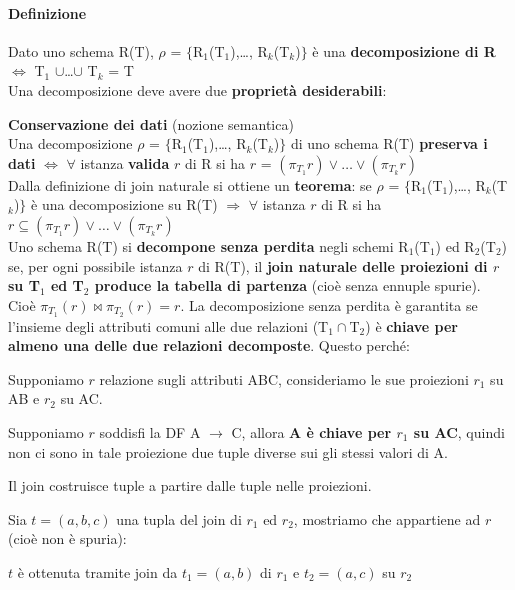 \documentclass[10pt]{book}
\begin{document}
\paragraph{Definizione} Dato uno schema R(T), $\rho$ = $\{$R$_1$(T$_1$),\ldots, R$_k$(T$_k$)$\}$ è una \textbf{decomposizione di R} $\Leftrightarrow$ T$_1$ $\cup$\ldots$\cup$ T$_k$ = T\\
Una decomposizione deve avere due \textbf{proprietà desiderabili}:
\begin{list}{}{}
	\item \textbf{Conservazione dei dati} (nozione semantica)\\
	Una decomposizione $\rho$ = $\{$R$_1$(T$_1$),\ldots, R$_k$(T$_k$)$\}$ di uno schema R(T) \textbf{preserva i dati} $\Leftrightarrow$ $\forall$ istanza \textbf{valida} $r$ di R si ha $r$ = $(\pi_{T_1}r)\vee\ldots\vee(\pi_{T_k}r)$\\
	Dalla definizione di join naturale si ottiene un \textbf{teorema}: se $\rho$ = $\{$R$_1$(T$_1$),\ldots, R$_k$(T$_k$)$\}$ è una decomposizione su R(T) $\Rightarrow$ $\forall$ istanza $r$ di R si ha $r\subseteq(\pi_{T_1}r)\vee\ldots\vee(\pi_{T_k}r)$\\
	Uno schema R(T) si \textbf{decompone senza perdita} negli schemi R$_1$(T$_1$) ed R$_2$(T$_2$) se, per ogni possibile istanza $r$ di R(T), il \textbf{join naturale delle proiezioni di $r$ su T$_1$ ed T$_2$ produce la tabella di partenza} (cioè senza ennuple spurie).\\
	Cioè $\pi_{T_1}(r)\bowtie\pi_{T_2}(r) = r$. La decomposizione senza perdita è garantita se l'insieme degli attributi comuni alle due relazioni (T$_1\cap$T$_2$) è \textbf{chiave per almeno una delle due relazioni decomposte}. Questo perché:
	\begin{list}{}{}
		\item Supponiamo $r$ relazione sugli attributi ABC, consideriamo le sue proiezioni $r_1$ su AB e $r_2$ su AC.
		\item Supponiamo $r$ soddisfi la DF A $\rightarrow$ C, allora \textbf{A è chiave per $r_1$ su AC}, quindi non ci sono in tale proiezione due tuple diverse sui gli stessi valori di A.
		\item Il join costruisce tuple a partire dalle tuple nelle proiezioni.
		\item Sia $t = (a, b, c)$ una tupla del join di $r_1$ ed $r_2$, mostriamo che appartiene ad $r$ (cioè non è spuria): \begin{list}{}{}
			\item $t$ è ottenuta tramite join da $t_1 = (a, b)$ di $r_1$ e $t_2 = (a, c)$ su $r_2$

\end{list}
\end{list}
\end{list}
\end{document}
